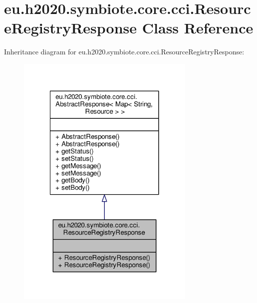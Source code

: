 \hypertarget{classeu_1_1h2020_1_1symbiote_1_1core_1_1cci_1_1ResourceRegistryResponse}{}\section{eu.\+h2020.\+symbiote.\+core.\+cci.\+Resource\+Registry\+Response Class Reference}
\label{classeu_1_1h2020_1_1symbiote_1_1core_1_1cci_1_1ResourceRegistryResponse}


Inheritance diagram for eu.\+h2020.\+symbiote.\+core.\+cci.\+Resource\+Registry\+Response\+:
\nopagebreak
\begin{figure}[H]
\begin{center}
\leavevmode
\includegraphics[width=242pt]{classeu_1_1h2020_1_1symbiote_1_1core_1_1cci_1_1ResourceRegistryResponse__inherit__graph}
\end{center}
\end{figure}


